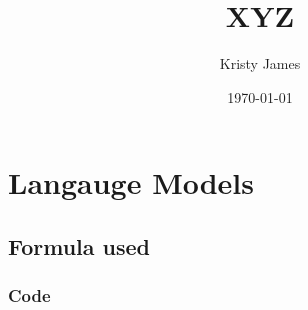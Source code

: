 \documentclass{article}
\title{XYZ}
\author{Kristy James}
\date{\today}
\begin{document}
  \maketitle


  \section{Langauge Models}

  \subsection{Formula used}

  \subsubsection{Code}
  
\end{document}
